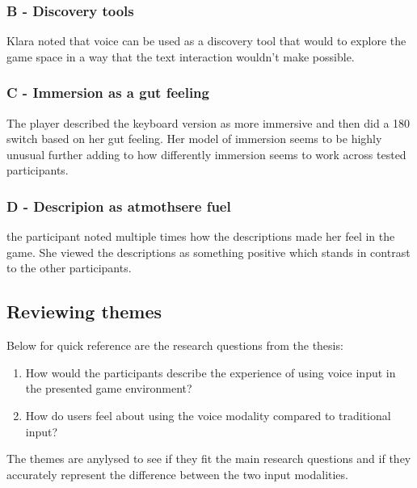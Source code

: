 \subsubsection{B - Discovery tools}

Klara noted that voice can be used as a discovery tool that would to explore the game space in a way that the text interaction wouldn't make possible. 


\subsubsection{C - Immersion as a gut feeling}

The player described the keyboard version as more immersive and then did a 180 switch based on her gut feeling. Her model of immersion seems to be highly unusual further adding to how differently immersion seems to work across tested participants.


\subsubsection{D - Descripion as atmothsere fuel}

the participant noted multiple times how the descriptions made her feel in the game. She viewed the descriptions as something positive which stands in contrast to the other participants.


\subsection{Reviewing themes}




Below for quick reference are the research questions from the thesis: 

\begin{enumerate}
    \item How would the participants describe the experience of using voice input in the presented
game environment?
    \item How do users feel about using the voice modality compared to traditional input?
\end{enumerate}

The themes are anylysed to see if they fit the main research questions and if they accurately represent the difference between the two input modalities.

